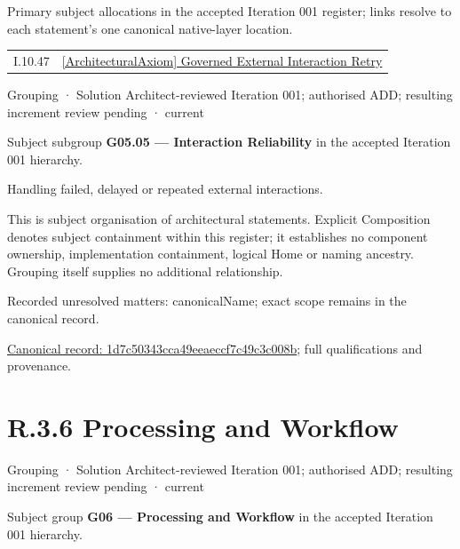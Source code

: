 Primary subject allocations in the accepted Iteration 001 register; links resolve to each statement’s one canonical native-layer location.\par
\begin{longtable}{p{.22\linewidth}p{.73\linewidth}}
I.10.47 & \hyperref[element:49c13eb367b44565a011a77b90108cb8]{[ArchitecturalAxiom] Governed External Interaction Retry} \\
\end{longtable}
\label{element:1d7c50343cca49eeaeccf7c49c3c008b}
{\small Grouping · Solution Architect-reviewed Iteration 001; authorised ADD; resulting increment review pending · current}\par

Subject subgroup \textbf{G05.05 — Interaction Reliability} in the accepted Iteration 001 hierarchy.



Handling failed, delayed or repeated external interactions.



This is subject organisation of architectural statements. Explicit Composition denotes subject containment within this register; it establishes no component ownership, implementation containment, logical Home or naming ancestry. Grouping itself supplies no additional relationship.


{\small Recorded unresolved matters: canonicalName; exact scope remains in the canonical record.}\par
{\footnotesize \href{../../../../continuum/grouping/1d7c50343cca49eeaeccf7c49c3c008b.md}{Canonical record: 1d7c50343cca49eeaeccf7c49c3c008b}; full qualifications and provenance.}\par
\section*{R.3.6 Processing and Workflow}
\label{navigation:R.3.6}

\label{element:afb9686c9f1c48159d92a518a7d17452}
{\small Grouping · Solution Architect-reviewed Iteration 001; authorised ADD; resulting increment review pending · current}\par

Subject group \textbf{G06 — Processing and Workflow} in the accepted Iteration 001 hierarchy.



